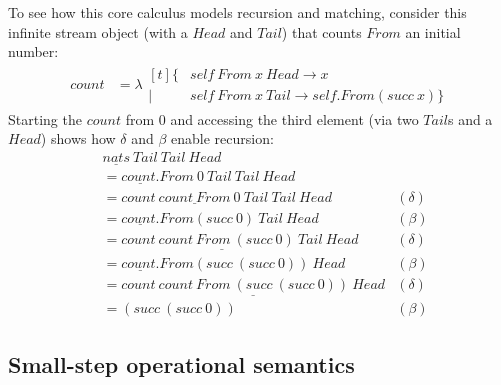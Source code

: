 \documentclass[sigplan,screen]{acmart}
\begin{document}
\begin{example}
\label{ex:count}
  
To see how this core calculus models recursion and matching, consider this
infinite stream object (with a $\mathit{Head}$ and $\mathit{Tail}$) that counts
$\mathit{From}$ an initial number:
\begin{align*}
  \mathit{count} &=
  \lambda
  \begin{aligned}[t]
    \{&
    \mathit{self}~\mathit{From}~x~\mathit{Head} \to x
    \\
    \mid&
    \mathit{self}~\mathit{From}~x~\mathit{Tail} \to \mathit{self}.\mathit{From}(\mathit{succ}~x)
    \}
  \end{aligned}
\end{align*}
Starting the $\mathit{count}$ from 0 and accessing the third element (via two
$\mathit{Tail}$s and a $\mathit{Head}$) shows how $\delta$ and $\beta$ enable
recursion:
\begin{align*}
  &
  \underline{\mathit{nats}}~\mathit{Tail}~\mathit{Tail}~\mathit{Head}
  \\
  &=
  \underline{\mathit{count}.}\mathit{From}~0~\mathit{Tail}~\mathit{Tail}~\mathit{Head}
  \\
  &=
  \underline{
    \mathit{count}~\mathit{count}~\mathit{From}~0~\mathit{Tail}
  }
  ~\mathit{Tail}~\mathit{Head}
  &(\delta)
  \\
  &=
  \underline{\mathit{count}.}\mathit{From}(\mathit{succ}~0)~\mathit{Tail}~\mathit{Head}
  &(\beta)
  \\
  &=
  \underline{
    \mathit{count}~\mathit{count}~\mathit{From}~(\mathit{succ}~0)~\mathit{Tail}
  }
  ~\mathit{Head}
  &(\delta)
  \\
  &=
  \underline{\mathit{count}.}\mathit{From}(\mathit{succ}~(\mathit{succ}~0))~\mathit{Head}
  &(\beta)
  \\
  &=
  \underline{
    \mathit{count}~\mathit{count}
    ~\mathit{From}~(\mathit{succ}~(\mathit{succ}~0))
    ~\mathit{Head}
  }
  &(\delta)
  \\
  &=
  (\mathit{succ}~(\mathit{succ}~0))
  &(\beta)
\end{align*}
\end{example}

\subsection{Small-step operational semantics}
\end{document}
